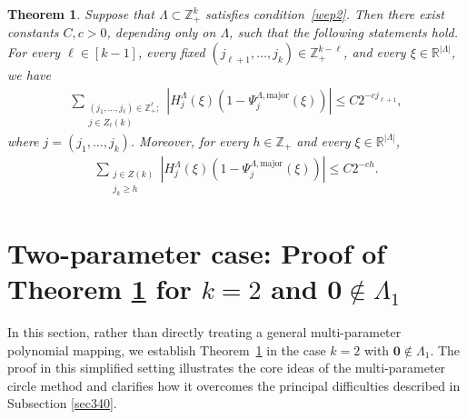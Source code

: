 \documentclass[11 pt,letterpaper]{amsart}
\theoremstyle{plain}
\newtheorem{theorem}{Theorem}\numberwithin{theorem}{section}
\theoremstyle{definition}
\theoremstyle{remark} \theoremstyle{exam} \theoremstyle{ob}
\numberwithin{equation}{section}
\begin{document}
\begin{theorem}\label{th41}
	Suppose that
	$\Lambda\subset\mathbb{Z}_+^k$
	satisfies condition~\eqref{wep2}.
	Then there exist constants $C,c>0$, depending only on $\Lambda$,
	such that the following statements hold.
	For every $\ell\in[k-1]$, every fixed
	$(j_{\ell+1},\ldots,j_k)\in\mathbb{Z}_+^{k-\ell}$, and every
	$\xi\in\mathbb{R}^{|\Lambda|}$, we have
	\begin{align}\label{rr1}
		\sum_{\substack{(j_1,\ldots,j_\ell)\in\mathbb{Z}_+^\ell ;\\
				j\in Z_\ell(k)}}
		\left|
		H_j^\Lambda(\xi)
		\left(
		1-\Psi_j^{\Lambda,\mathrm{major}}(\xi)
		\right)
		\right|
		\leq C2^{-c j_{\ell+1}},
	\end{align}
	where
	$j=(j_1,\ldots,j_k)$.
	Moreover, for every $h\in\mathbb{Z}_+$ and every
	$\xi\in\mathbb{R}^{|\Lambda|}$,
	\begin{align}\label{bb330}
		\sum_{\substack{j\in Z(k)\\ j_k\geq h}}
		\left|
		H_j^\Lambda(\xi)
		\left(
		1-\Psi_j^{\Lambda,\mathrm{major}}(\xi)
		\right)
		\right|
		\leq C2^{-ch}.
	\end{align}
\end{theorem}






 







 
 
\section{Two-parameter case: Proof of Theorem \ref{th41} for $k=2$ and   $\textbf{0}\notin \Lambda_1$}\label{sec4}
In this section, rather than directly treating a general multi-parameter polynomial mapping, we establish Theorem~\ref{th41} in the case $k=2$ with $\textbf{0}\notin \Lambda_1$.
The proof in this simplified setting illustrates the core ideas of the multi-parameter circle method and clarifies how it overcomes the principal difficulties described in Subsection \ref{sec340}.
\end{document}
